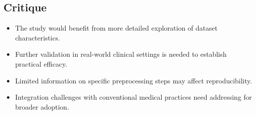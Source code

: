 \subsection*{Critique}
\begin{itemize}
    \item The study would benefit from more detailed exploration of dataset characteristics.
    \item Further validation in real-world clinical settings is needed to establish practical efficacy.
    \item Limited information on specific preprocessing steps may affect reproducibility.
    \item Integration challenges with conventional medical practices need addressing for broader adoption.
\end{itemize}

